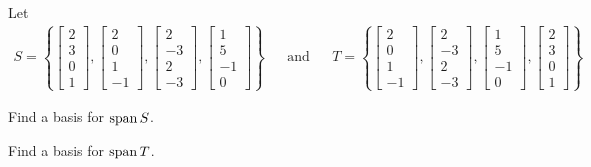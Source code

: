 \begin{activity}{10}
  Let
  \begin{align*}
  S=\left\{
  \begin{bmatrix}2\\3\\0\\1\end{bmatrix},
  \begin{bmatrix}2\\0\\1\\-1\end{bmatrix},
  \begin{bmatrix}2\\-3\\2\\-3\end{bmatrix},
  \begin{bmatrix}1\\5\\-1\\0\end{bmatrix}
  \right\} & & \text{and}  & &
  T=\left\{
  \begin{bmatrix}2\\0\\1\\-1\end{bmatrix},
  \begin{bmatrix}2\\-3\\2\\-3\end{bmatrix},
  \begin{bmatrix}1\\5\\-1\\0\end{bmatrix},
  \begin{bmatrix}2\\3\\0\\1\end{bmatrix}
  \right\}
  \end{align*}
  \begin{subactivity}
  Find a basis for \(\operatorname{span} S\).
  \end{subactivity}
  \begin{subactivity}
  Find a basis for \(\operatorname{span} T\).
  \end{subactivity}
\end{activity}


